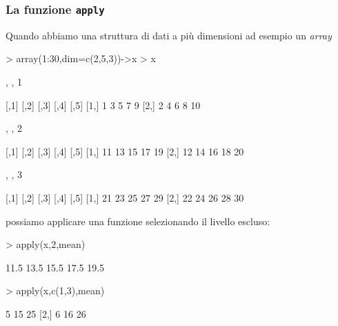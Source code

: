 \documentclass[onecolumn,11pt]{book}
\begin{document}
\subsubsection{La funzione \texttt{apply}}
Quando abbiamo una struttura di dati a pi\`u dimensioni ad esempio un \emph{array}
\begin{Schunk}
\begin{Sinput}
> array(1:30,dim=c(2,5,3))->x
> x
\end{Sinput}
\begin{Soutput}
, , 1

     [,1] [,2] [,3] [,4] [,5]
[1,]    1    3    5    7    9
[2,]    2    4    6    8   10

, , 2

     [,1] [,2] [,3] [,4] [,5]
[1,]   11   13   15   17   19
[2,]   12   14   16   18   20

, , 3

     [,1] [,2] [,3] [,4] [,5]
[1,]   21   23   25   27   29
[2,]   22   24   26   28   30
\end{Soutput}
\end{Schunk}
possiamo applicare una funzione selezionando il livello escluso: 
\begin{Schunk}
\begin{Sinput}
> apply(x,2,mean)
\end{Sinput}
\begin{Soutput}
[1] 11.5 13.5 15.5 17.5 19.5
\end{Soutput}
\begin{Sinput}
> apply(x,c(1,3),mean)
\end{Sinput}
\begin{Soutput}
     [,1] [,2] [,3]
[1,]    5   15   25
[2,]    6   16   26
\end{Soutput}
\end{Schunk}
\end{document}
